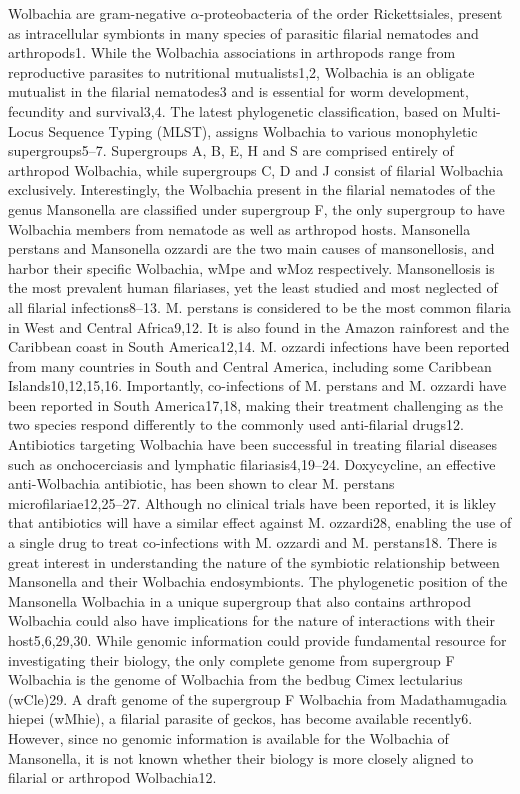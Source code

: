 \documentclass[10pt, a4paper, twocolumn]{article} %
\begin{document}
Wolbachia are gram-negative $\alpha$-proteobacteria of the order Rickettsiales, present as intracellular symbionts in many species of parasitic filarial nematodes and arthropods1. While the Wolbachia associations in arthropods range from reproductive parasites to nutritional mutualists1,2, Wolbachia is an obligate mutualist in the filarial nematodes3 and is essential for worm development, fecundity and survival3,4. The latest phylogenetic classification, based on Multi-Locus Sequence Typing (MLST), assigns Wolbachia to various monophyletic supergroups5–7. Supergroups A, B, E, H and S are comprised entirely of arthropod Wolbachia, while supergroups C, D and J consist of filarial Wolbachia exclusively. Interestingly, the Wolbachia present in the filarial nematodes of the genus Mansonella are classified under supergroup F, the only supergroup to have Wolbachia members from nematode as well as arthropod hosts.
Mansonella perstans and Mansonella ozzardi are the two main causes of mansonellosis, and harbor their specific Wolbachia, wMpe and wMoz respectively. Mansonellosis is the most prevalent human filariases, yet the least studied and most neglected of all filarial infections8–13. M. perstans is considered to be the most common filaria in West and Central Africa9,12. It is also found in the Amazon rainforest and the Caribbean coast in South America12,14. M. ozzardi infections have been reported from many countries in South and Central America, including some Caribbean Islands10,12,15,16. Importantly, co-infections of M. perstans and M. ozzardi have been reported in South America17,18, making their treatment challenging as the two species respond differently to the commonly used anti-filarial drugs12. Antibiotics targeting Wolbachia have been successful in treating filarial diseases such as onchocerciasis and lymphatic filariasis4,19–24. Doxycycline, an effective anti-Wolbachia antibiotic, has been shown to clear M. perstans microfilariae12,25–27. Although no clinical trials have been reported, it is likley that antibiotics will have a similar effect against M. ozzardi28, enabling the use of a single drug to treat co-infections with M. ozzardi and M. perstans18. 
There is great interest in understanding the nature of the symbiotic relationship between Mansonella and their Wolbachia endosymbionts. The phylogenetic position of the Mansonella Wolbachia in a unique supergroup that also contains arthropod Wolbachia could also have implications for the nature of interactions with their host5,6,29,30. While genomic information could provide fundamental resource for investigating their biology, the only complete genome from supergroup F Wolbachia is the genome of Wolbachia from the bedbug Cimex lectularius (wCle)29. A draft genome of the supergroup F Wolbachia from Madathamugadia hiepei (wMhie), a filarial parasite of geckos, has become available recently6. However, since no genomic information is available for the Wolbachia of Mansonella, it is not known whether their biology is more closely aligned to filarial or arthropod Wolbachia12. 
\end{document}
